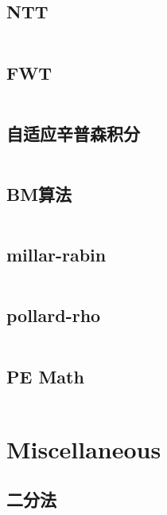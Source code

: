 \documentclass[a4paper]{article}
\newcommand{\cppcode}[1]{
    \inputminted[mathescape]{cpp}{#1}
}
\begin{document}
\cppcode{math/FFT.cpp}

\subsection{NTT}

\cppcode{math/NTT.cpp}

\subsection{FWT}

\cppcode{math/FWT.cpp}


\subsection{自适应辛普森积分}

\cppcode{math/self-adapted-simpson.cpp}

\subsection{BM算法}

\cppcode{math/Berlekamp-Massey.cpp}

\subsection{millar-rabin}

\cppcode{millar-rabin.cpp}

\subsection{pollard-rho}

\cppcode{pollard-rho.cpp}

\subsection{PE Math}

\cppcode{math/PEmath.cpp}



\section{Miscellaneous}

\subsection{二分法}
\end{document}
